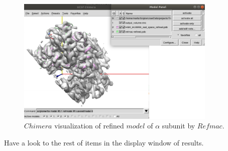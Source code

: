 \begin{itemize}
  \begin{figure}[H]
  \centering 
  \captionsetup{width=.7\linewidth} 
  \includegraphics[width=0.85\textwidth]{Images/Fig33}
  \caption{$Chimera$ visualization of refined $model$ of  $\alpha$ subunit by $Refmac$.}
  \label{fig:refmac_chimera}
  \end{figure}
  
  Have a look to the rest of items in the display window of results. 
  
  \end{itemize}
